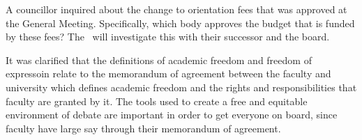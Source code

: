 \begin{information}
    A councillor inquired about the change to orientation fees that was
    approved at the General Meeting. Specifically, which body approves the 
    budget that is funded by these fees? The \pres\ will investigate this with
    their successor and the board.

    It was clarified that the definitions of academic freedom and freedom of 
    expressoin relate to the memorandum of agreement between the
    faculty and university which defines academic freedom and the rights and
    responsibilities that faculty are granted by it. The tools used to create
    a free and equitable environment of debate are important in order to get
    everyone on board, since faculty have large say through their memorandum
    of agreement.

\end{information}

